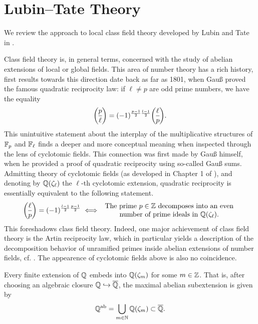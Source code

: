 \documentclass[../main.tex]{subfiles}
\begin{document}
\section{Lubin--Tate Theory} %
\label{sec:Local Class Field Theory}
We review the approach to local class field theory developed by Lubin and Tate in \cite{LubinTateFormalMult}. 

Class field theory is, in general terms, concerned with the study of 
abelian extensions of local or global fields. This area of number theory 
has a rich history, first results towards this direction date back as far as
1801, when Gauß proved the famous quadratic reciprocity law: if $\ell \neq p$
are odd prime numbers, we have the equality
\begin{equation*}
  \legendre p \ell = (-1)^{\frac{p-1}2 \frac{l-1}2} \legendre \ell p.
\end{equation*}
This unintuitive statement about the interplay of the multiplicative structures of
$\mathbb{F}_p$ and $\mathbb{F}_\ell$ finds a deeper and more conceptual meaning when inspected through
the lens of cyclotomic fields. This connection
was first made by Gauß himself, when he provided a proof of quadratic
reciprocity using so-called Gauß sums. Admitting theory of cyclotomic fields 
(as developed in Chapter 1 of \cite{neukirch2006algebraische}), and denoting by
$\mathbb{Q}(\zeta_\ell)$ the $\ell$-th cyclotomic extension,
quadratic reciprocity is essentially equivalent to the following statement.
\begin{equation*}
  \legendre \ell p = (-1)^{\frac{l-1}2 \frac{p-1}2} \iff \begin{array}c
    \text{The prime $p \in \Z$
    decomposes into an even} \\ \text{number of prime ideals in
  $\Q(\zeta_\ell)$.} \end{array}
\end{equation*}
This foreshadows class field theory. Indeed, one major achievement
of class field theory is the Artin reciprocity law, which in particular yields a 
description of the decomposition behavior of unramified primes inside abelian extensions
of number fields, cf. \cite[Theorem 7.3]{neukirch2006algebraische}. 
The appearence of cyclotomic fields above is also no coincidence.

\begin{thm*} \label{thm:KroneckerWeber}
  Every finite extension of $\mathbb{Q}$ embeds into $\mathbb{Q}(\zeta_m)$ for some $m \in \mathbb{Z}$.
  That is, after choosing an algebraic closure $\mathbb{Q} \hookrightarrow \overline {\mathbb{Q}}$, the maximal abelian
  subextension is given by 
  \begin{equation*}
    \mathbb{Q}^{\mathrm{ab}} = \bigcup_{m \in \mathbb{N}} \mathbb{Q}(\zeta_m) \subset \overline {\mathbb{Q}}.
  \end{equation*}
\end{thm*}
\end{document}
